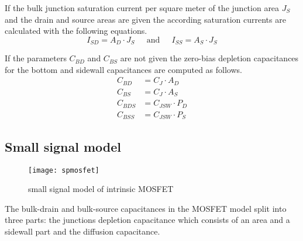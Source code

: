 If the bulk junction saturation current per square meter of the
junction area $J_S$ and the drain and source areas are given the
according saturation currents are calculated with the following
equations.
\begin{equation}
I_{SD} = A_{D}\cdot J_{S}
\;\;\;\; \textrm{ and } \;\;\;\;
I_{SS} = A_{S}\cdot J_{S}
\end{equation}

If the parameters $C_{BD}$ and $C_{BS}$ are not given the zero-bias
depletion capacitances for the bottom and sidewall capacitances are
computed as follows.
\begin{align}
C_{BD} &= C_{J}\cdot A_D\\
C_{BS} &= C_{J}\cdot A_S\\
C_{BDS} &= C_{JSW}\cdot P_D\\
C_{BSS} &= C_{JSW}\cdot P_S
\end{align}

\subsection{Small signal model}
\label{sec:SmallSignalMOS}

\begin{figure}[ht]
\begin{center}
\texttt{[image: spmosfet]}
\end{center}
\caption{small signal model of intrinsic MOSFET}
\label{fig:spmosfet}
\end{figure}
\FloatBarrier

The bulk-drain and bulk-source capacitances in the MOSFET model split
into three parts: the junctions depletion capacitance which consists
of an area and a sidewall part and the diffusion capacitance.

